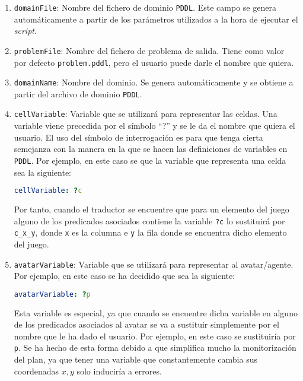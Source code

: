 \begin{enumerate}
    \item \texttt{domainFile}: Nombre del fichero de dominio \texttt{PDDL}. Este campo se genera
    automáticamente a partir de los parámetros utilizados a la hora de ejecutar el \textit{script}.
    
    \item \texttt{problemFile}: Nombre del fichero de problema de salida. Tiene como valor por defecto
    \texttt{problem.pddl}, pero el usuario puede darle el nombre que quiera.
    
    \item \texttt{domainName}: Nombre del dominio. Se genera automáticamente y se obtiene a partir del
    archivo de dominio \texttt{PDDL}.
    
    \item \texttt{cellVariable}: Variable que se utilizará para representar las celdas. Una variable
    viene precedida por el símbolo ``?'' y se le da el nombre que quiera el usuario. El uso del símbolo
    de interrogación es para que tenga cierta semejanza con la manera en la que se hacen las definiciones
    de variables en \texttt{PDDL}. Por ejemplo, en este caso se que la variable que representa una celda
    sea la siguiente:
    
    \begin{lstlisting}[language=yaml]
cellVariable: ?c
    \end{lstlisting}
    
    Por tanto, cuando el traductor se encuentre que para un elemento del juego alguno de los predicados
    asociados contiene la variable \texttt{?c} lo sustituirá por \texttt{c\_x\_y}, donde \texttt{x} es
    la columna e \texttt{y} la fila donde se encuentra dicho elemento del juego.
    
    \item \texttt{avatarVariable}: Variable que se utilizará para representar al avatar/agente. Por
    ejemplo, en este caso se ha decidido que sea la siguiente:
    
    \begin{lstlisting}[language=yaml]
avatarVariable: ?p
    \end{lstlisting}
    
    Esta variable es especial, ya que cuando se encuentre dicha variable en alguno de los predicados asociados
    al avatar se va a sustituir simplemente por el nombre que le ha dado el usuario. Por ejemplo,
    en este caso se sustituiría por \texttt{p}. Se ha hecho de esta forma debido a que simplifica
    mucho la monitorización del plan, ya que tener una variable que constantemente cambia sus coordenadas
    $x,y$ solo induciría a errores.
    

\end{enumerate}
